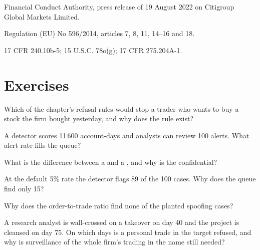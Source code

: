 \begin{omsources}
\item Financial Conduct Authority, press release of 19 August 2022 on Citigroup Global Markets Limited.
\item Regulation (EU) No 596/2014, articles 7, 8, 11, 14--16 and 18.
\item 17 CFR 240.10b-5; 15 U.S.C. 78o(g); 17 CFR 275.204A-1.
\end{omsources}

\section{Exercises}

\begin{exercise}[$\star$]\label{exo:fm:compliance-and-market-abuse:1}
Which of the chapter's refusal rules would stop a trader who wants to buy a stock the firm bought yesterday, and why does the rule exist?
\end{exercise}

\begin{exercise}[$\star$]\label{exo:fm:compliance-and-market-abuse:2}
A detector scores 11\,600 account-days and analysts can review 100 alerts. What alert rate fills the queue?
\end{exercise}

\begin{exercise}[$\star$]\label{exo:fm:compliance-and-market-abuse:3}
What is the difference between a  and a , and why is the  confidential?
\end{exercise}

\begin{exercise}[$\star\star$]\label{exo:fm:compliance-and-market-abuse:4}
At the default 5\% rate the detector flags 89 of the 100 cases. Why does the queue find only 15?
\end{exercise}

\begin{exercise}[$\star\star$]\label{exo:fm:compliance-and-market-abuse:5}
Why does the order-to-trade ratio find none of the planted spoofing cases?
\end{exercise}

\begin{exercise}[$\star\star$]\label{exo:fm:compliance-and-market-abuse:6}
A research analyst is wall-crossed on a takeover on day 40 and the project is cleansed on day 75. On which days is a personal trade in the target
refused, and why is surveillance of the whole firm's trading in the name still needed?
\end{exercise}

